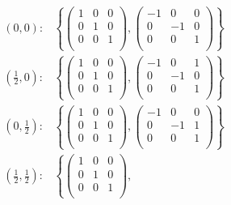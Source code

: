 \begin{align*}
  (0, 0): &\left\{
    \left( \begin{array}{cc|c}
      1 & 0 & 0 \\
      0 & 1 & 0 \\
      \hline
      0 & 0 & 1 \\
    \end{array} \right),
    \left( \begin{array}{cc|c}
      -1 & 0 & 0 \\
      0 & -1 & 0 \\
      \hline
      0 & 0 & 1 \\
    \end{array} \right)
  \right\} \\
  \left( \frac{1}{2}, 0 \right): &\left\{
    \left( \begin{array}{cc|c}
      1 & 0 & 0 \\
      0 & 1 & 0 \\
      \hline
      0 & 0 & 1 \\
    \end{array} \right),
    \left( \begin{array}{cc|c}
      -1 & 0 & 1 \\
      0 & -1 & 0 \\
      \hline
      0 & 0 & 1 \\
    \end{array} \right)
  \right\} \\
  \left( 0, \frac{1}{2} \right): &\left\{
    \left( \begin{array}{cc|c}
      1 & 0 & 0 \\
      0 & 1 & 0 \\
      \hline
      0 & 0 & 1 \\
    \end{array} \right),
    \left( \begin{array}{cc|c}
      -1 & 0 & 0 \\
      0 & -1 & 1 \\
      \hline
      0 & 0 & 1 \\
    \end{array} \right)
  \right\} \\
  \left( \frac{1}{2}, \frac{1}{2} \right): &\left\{
    \left( \begin{array}{cc|c}
      1 & 0 & 0 \\
      0 & 1 & 0 \\
      \hline
      0 & 0 & 1 \\
    \end{array} \right),

\end{align*}
